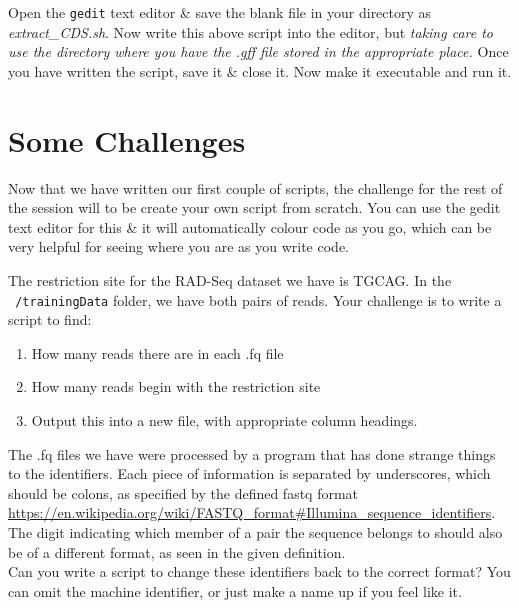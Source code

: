 \begin{steps}
Open the \texttt{gedit} text editor \& save the blank file in your directory as \textit{extract\_CDS.sh}.
Now write this above script into the editor, but \textit{taking care to use the directory where you have the .gff file stored in the appropriate place.}
Once you have written the script, save it \& close it.
Now make it executable and run it.\\
\end{steps}


\section{Some Challenges}
Now that we have written our first couple of scripts, the challenge for the rest of the session will to be create your own script from scratch.
You can use the gedit text editor for this \& it will automatically colour code as you go, which can be very helpful for seeing where you are as you write code.

\begin{advanced}
The restriction site for the RAD-Seq dataset we have is TGCAG.
In the \texttt{~/trainingData} folder, we have both pairs of reads.
Your challenge is to write a script to find:
\begin{enumerate}
\item How many reads there are in each .fq file
\item How many reads begin with the restriction site
\item Output this into a new file, with appropriate column headings. \\
\end{enumerate}

The .fq files we have were processed by a program that has done strange things to the identifiers.
Each piece of information is separated by underscores, which should be colons, as specified by the defined fastq format \url{https://en.wikipedia.org/wiki/FASTQ\_format#Illumina\_sequence\_identifiers}.
The digit indicating which member of a pair the sequence belongs to should also be of a different format, as seen in the given definition.\\

Can you write a script to change these identifiers back to the correct format? 
You can omit the machine identifier, or just make a name up if you feel like it.
\end{advanced}

